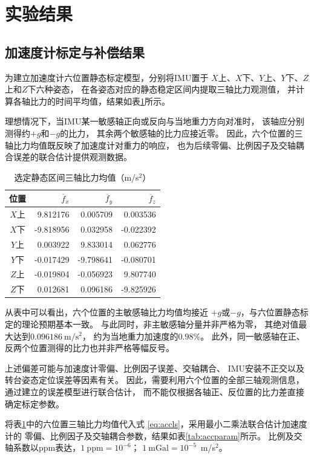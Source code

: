 \section{实验结果}

\subsection{加速度计标定与补偿结果}
为建立加速度计六位置静态标定模型，分别将IMU置于
$X$上、$X$下、$Y$上、$Y$下、$Z$上和$Z$下六种姿态，
在各姿态对应的静态稳定区间内提取三轴比力观测值，
并计算各轴比力的时间平均值，结果如表\ref{tab:means}所示。

理想情况下，当IMU某一敏感轴正向或反向与当地重力方向对准时，
该轴应分别测得约$+g$和$-g$的比力，
其余两个敏感轴的比力应接近零。
因此，六个位置的三轴比力均值既反映了加速度计对重力的响应，
也为后续零偏、比例因子及交轴耦合误差的联合估计提供观测数据。
\begin{table}[htbp]\centering\small
    \caption{选定静态区间三轴比力均值（m/s$^2$）}\label{tab:means}
    \begin{tabular}{crrr}\toprule
    位置&$\overline f_x$&$\overline f_y$&$\overline f_z$\\\midrule
    $X$上&9.812176&0.005709&0.003536\\
    $X$下&-9.818956&0.032958&-0.022392\\
    $Y$上&0.003922&9.833014&0.062776\\
    $Y$下&-0.017429&-9.798641&-0.080701\\
    $Z$上&-0.019804&-0.056923&9.807740\\
    $Z$下&0.012681&0.096186&-9.825926\\\bottomrule
    \end{tabular}
\end{table}
从表中可以看出，六个位置的主敏感轴比力均值均接近
$+g$或$-g$，与六位置静态标定的理论预期基本一致。
与此同时，非主敏感轴分量并非严格为零，
其绝对值最大达到$0.096186~\mathrm{m/s^2}$，
约为当地重力加速度的$0.98\%$。
此外，同一敏感轴在正、反两个位置测得的比力也并非严格等幅反号。

上述偏差可能与加速度计零偏、比例因子误差、交轴耦合、
IMU安装不正交以及转台姿态定位误差等因素有关。
因此，需要利用六个位置的全部三轴观测信息，
通过建立的误差模型进行联合估计，
而不能仅根据各轴正、反位置的比力差直接确定标定参数。

将表\ref{tab:means}中的六位置三轴比力均值代入式
\eqref{eq:accls}，采用最小二乘法联合估计加速度计的
零偏、比例因子及交轴耦合参数，结果如表\ref{tab:accparam}所示。
比例及交轴系数以ppm表达，$1~\mathrm{ppm}=10^{-6}$；
$1~\mathrm{mGal}=10^{-5}$~m/s$^2$。

